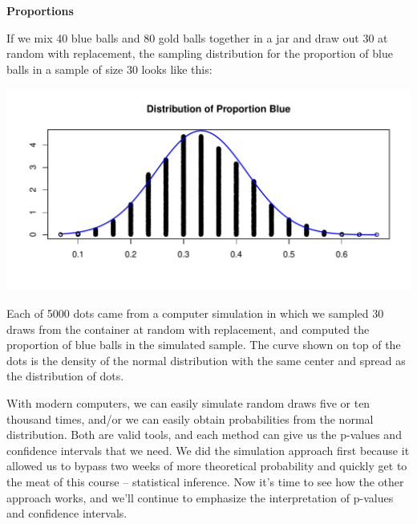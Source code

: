 \def\theTopic{Normal Proportions }
\def\dayNum{22 }


\begin{center}
   {\Large\bf  Proportions}
 \end{center}

If we mix 40 blue balls and 80 gold balls together in a jar and draw
out 30 at random with replacement, the sampling distribution for the
proportion of blue balls in a sample of size 30 looks like this:

\includegraphics[width=.8\linewidth]{plots/sample1.pdf}

Each of 5000 dots came from a computer simulation in which we sampled
30 draws from the container at random with replacement, and computed
the proportion of blue balls in the simulated sample.  The curve shown
on top of the dots is the density of the normal distribution with the
same center and spread as the distribution of dots.

With modern computers, we can easily simulate random draws five or ten
thousand times, and/or we can easily obtain probabilities from the
normal distribution.  Both are valid tools, and each method can give
us the p-values and confidence intervals that we need.  We did the
simulation approach first because it allowed us to bypass two weeks of
more theoretical probability and quickly get to the meat of this
course -- statistical inference.  Now it's time to see how the other
approach works, and we'll continue to emphasize the interpretation of
p-values and confidence intervals.  



